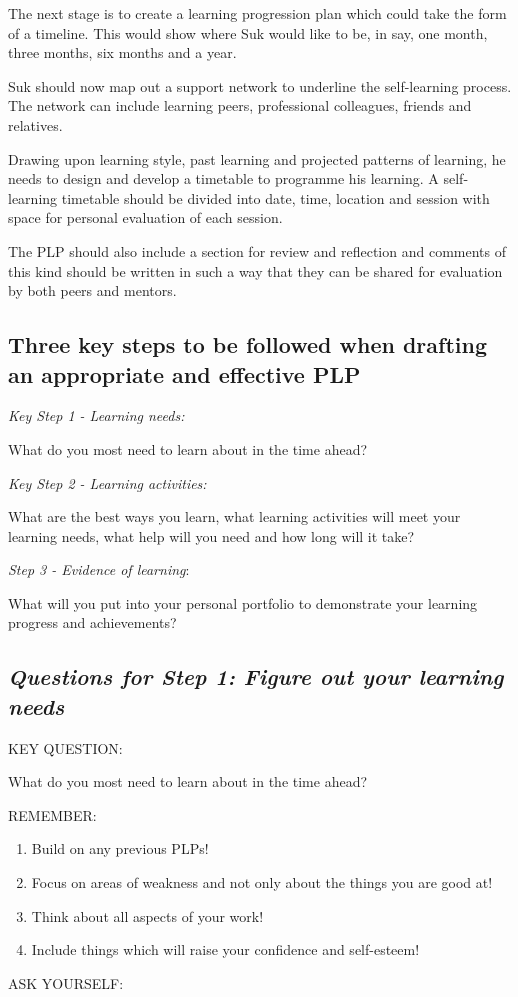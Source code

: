 The next stage is to create a learning progression plan which could take
the form of a timeline. This would show where Suk would like to be, in
say, one month, three months, six months and a year.

Suk should now map out a support network to underline the self-learning
process. The network can include learning peers, professional
colleagues, friends and relatives.

Drawing upon learning style, past learning and projected patterns of
learning, he needs to design and develop a timetable to programme his
learning. A self-learning timetable should be divided into date, time,
location and session with space for personal evaluation of each session.

The PLP should also include a section for review and reflection and
comments of this kind should be written in such a way that they can be
shared for evaluation by both peers and mentors.

\subsection{Three key steps to be followed when drafting an appropriate
and effective PLP}

\emph{Key Step 1 - Learning needs:}

What do you most need to learn about in the time ahead?

\emph{Key Step 2 - Learning activities:}

What are the best ways you learn, what learning activities will meet
your learning needs, what help will you need and how long will it take?

\emph{Step 3 - Evidence of learning}:

What will you put into your personal portfolio to demonstrate your
learning progress and achievements?

\subsection{\emph{Questions for Step 1: Figure out your learning needs}}

KEY QUESTION:

What do you most need to learn about in the time ahead?

REMEMBER:

\begin{enumerate}
\item
  Build on any previous PLPs!
\item
  Focus on areas of weakness and not only about the things you are good
  at!
\item
  Think about all aspects of your work!
\item
  Include things which will raise your confidence and self-esteem!
\end{enumerate}
ASK YOURSELF:

